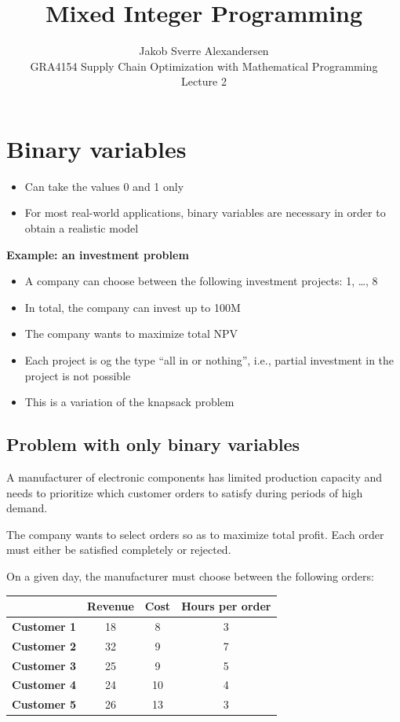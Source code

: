 \documentclass[10pt]{article}
\begin{document}
 
\title{Mixed Integer Programming}
\author{Jakob Sverre Alexandersen\\
GRA4154 Supply Chain Optimization with Mathematical Programming\\
Lecture 2}
\maketitle

\tableofcontents
\newpage

\section{Binary variables}

\begin{itemize}
    \item Can take the values 0 and 1 only
    \item For most real-world applications, binary variables are necessary in order to obtain a realistic model 
\end{itemize}

\textbf{Example: an investment problem}
\begin{itemize}
    \item A company can choose between the following investment projects: 1, …, 8
    \item In total, the company can invest up to 100M
    \item The company wants to maximize total NPV
    \item Each project is og the type ``all in or nothing'', i.e., partial investment in the project is not possible
    \item This is a variation of the knapsack problem
\end{itemize}

\subsection{Problem with only binary variables}
A manufacturer of electronic components has limited production capacity and needs to prioritize which customer orders to satisfy during periods of high demand. 

The company wants to select orders so as to maximize total profit. Each order must either be satisfied completely or rejected. 

On a given day, the manufacturer must choose between the following orders: 
\begin{center}
    \begin{tabular}{|c|c|c|c|}
        \hline 
        & \textbf{Revenue} & \textbf{Cost} & \textbf{Hours per order}\\\hline 
        \textbf{Customer 1} & 18 & 8 & 3 \\\hline
        \textbf{Customer 2} & 32 & 9 & 7 \\\hline
        \textbf{Customer 3} & 25 & 9 & 5 \\\hline
        \textbf{Customer 4} & 24 & 10 & 4 \\\hline
        \textbf{Customer 5} & 26 & 13 & 3 \\\hline
    \end{tabular}
\end{center}
\end{document}
